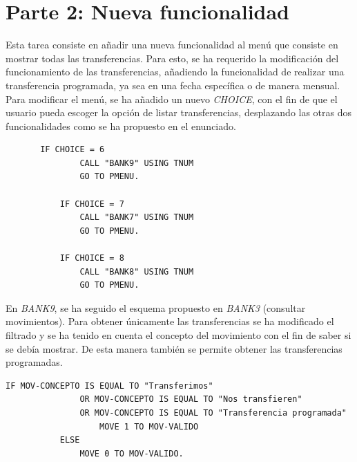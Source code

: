 \documentclass[10pt,a4paper]{article}
\begin{document}
\section{Parte 2: Nueva funcionalidad}

Esta tarea consiste en añadir una nueva funcionalidad al menú que consiste en mostrar todas las transferencias. Para esto, se ha requerido la modificación del funcionamiento de las transferencias, añadiendo la funcionalidad de realizar una transferencia programada, ya sea en una fecha específica o de manera mensual.\\
Para modificar el menú, se ha añadido un nuevo \emph{CHOICE}, con el fin de que el usuario pueda escoger la opción de listar transferencias, desplazando las otras dos funcionalidades como se ha propuesto en el enunciado.

\newpage
\begin{lstlisting}
	   IF CHOICE = 6 
               CALL "BANK9" USING TNUM
               GO TO PMENU.

           IF CHOICE = 7
               CALL "BANK7" USING TNUM
               GO TO PMENU.

           IF CHOICE = 8
               CALL "BANK8" USING TNUM
               GO TO PMENU.
\end{lstlisting}

En \emph{BANK9}, se ha seguido el esquema propuesto en \emph{BANK3} (consultar movimientos).
Para obtener únicamente las transferencias se ha modificado el filtrado y se ha tenido en cuenta el concepto del movimiento con el fin de saber si se debía mostrar. De esta manera también se permite obtener las transferencias programadas.


\begin{lstlisting}
IF MOV-CONCEPTO IS EQUAL TO "Transferimos" 
               OR MOV-CONCEPTO IS EQUAL TO "Nos transfieren"
               OR MOV-CONCEPTO IS EQUAL TO "Transferencia programada"
                   MOVE 1 TO MOV-VALIDO
           ELSE 
               MOVE 0 TO MOV-VALIDO. 
\end{lstlisting}
\end{document}
